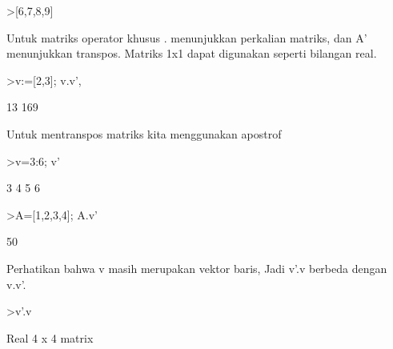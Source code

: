 \documentclass[a4paper,10pt]{article}
\begin{document}
\begin{eulernotebook}
\begin{eulercomment}
\begin{eulercomment}
\begin{eulercomment}
\begin{eulercomment}
\begin{eulercomment}
\end{eulercomment}
\begin{eulerprompt}
>[6,7,8,9]
\end{eulerprompt}
\begin{euleroutput}
  [6,  7,  8,  9]
\end{euleroutput}
\begin{eulercomment}
Untuk matriks operator khusus . menunjukkan perkalian matriks, dan A'
menunjukkan transpos. Matriks 1x1 dapat digunakan seperti bilangan
real.
\end{eulercomment}
\begin{eulerprompt}
>v:=[2,3]; v.v', %
\end{eulerprompt}
\begin{euleroutput}
  13
  169
\end{euleroutput}
\begin{eulercomment}
Untuk mentranspos matriks kita menggunakan apostrof
\end{eulercomment}
\begin{eulerprompt}
>v=3:6; v'
\end{eulerprompt}
\begin{euleroutput}
                        3 
                        4 
                        5 
                        6 
\end{euleroutput}
\begin{eulerprompt}
>A=[1,2,3,4]; A.v'
\end{eulerprompt}
\begin{euleroutput}
  50
\end{euleroutput}
\begin{eulercomment}
Perhatikan bahwa v masih merupakan vektor baris, Jadi v'.v berbeda
dengan v.v'.
\end{eulercomment}
\begin{eulerprompt}
>v'.v
\end{eulerprompt}
\begin{euleroutput}
  Real 4 x 4 matrix
  

\end{euleroutput}
\end{eulercomment}
\end{eulercomment}
\end{eulercomment}
\end{eulercomment}
\end{eulernotebook}
\end{document}
